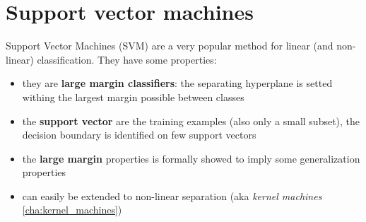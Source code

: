 \chapter{Support vector machines}
\label{cha:SVMs}

Support Vector Machines (SVM) are a very popular method for linear (and non-linear) classification. They have some properties:
\begin{itemize}
    \item they are \textbf{large margin classifiers}: the separating hyperplane is setted withing the largest margin possible between classes
    \item the \textbf{support vector} are the training examples (also only a small subset), the decision boundary is identified on few support vectors
    \item the \textbf{large margin} properties is formally showed to imply some generalization properties
    \item can easily be extended to non-linear separation (aka \textit{kernel machines} \ref{cha:kernel_machines})
\end{itemize}


